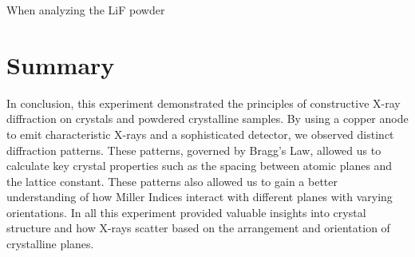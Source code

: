 \documentclass[a4paper,12pt,english]{all-in-one} %
\begin{document}
\begin{multicols}{2}
{%

When analyzing the LiF powder 


}


\end{multicols}

\section*{Summary}
{
In conclusion, this experiment demonstrated the principles of constructive X-ray diffraction on crystals and powdered crystalline samples. By using a copper anode to emit characteristic X-rays and a sophisticated detector, we observed distinct diffraction patterns. These patterns, governed by Bragg’s Law, allowed us to calculate key crystal properties such as the spacing between atomic planes and the lattice constant. These patterns also allowed us to gain a better understanding of how Miller Indices interact with different planes with varying orientations. In all this experiment provided valuable insights into crystal structure and how X-rays scatter based on the arrangement and orientation of crystalline planes.
}
\end{document}
